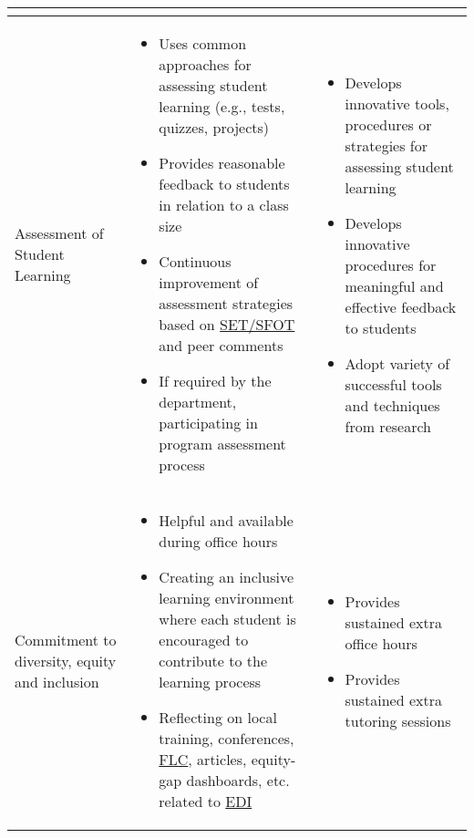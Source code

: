 \documentclass{article}
\begin{document}
\begin{longtable}{p{2cm}p{6cm}P{6cm}}
\begin{itemize}[noitemsep,leftmargin=*,topsep=0pt,partopsep=0pt]
    \end{itemize}\\ 
\hline
Assessment of Student Learning
 & \vspace{-\baselineskip}%
  \begin{itemize}[noitemsep,leftmargin=*,topsep=0pt,partopsep=0pt]
        \item Uses common approaches for assessing student learning (e.g., tests, quizzes, projects)
        \item Provides reasonable feedback to students in relation to a class size     
        \item Continuous improvement of assessment strategies based on \href{https://www.csuchico.edu/ir/sfot/}{SET/SFOT} and peer comments
        \item If required by the department, participating in program assessment process
    \end{itemize}
  & %
    \begin{itemize}[noitemsep,leftmargin=*,topsep=0pt,partopsep=0pt]
        \item Develops innovative tools, procedures or strategies for assessing student learning
        \item Develops innovative procedures for meaningful and effective feedback to students
        \item Adopt variety of successful tools and techniques from research
     \end{itemize}\\ 
\hline
Commitment to diversity, equity and inclusion
 & \vspace{-\baselineskip}%
  \begin{itemize}[noitemsep,leftmargin=*,topsep=0pt,partopsep=0pt]
        \item Helpful and available during office hours
        \item Creating an inclusive learning environment where each student is encouraged to contribute to the learning process
        \item Reflecting on local training, conferences, \href{https://www.csuchico.edu/fdev/homepage/flcs.shtml}{FLC}, articles, equity-gap dashboards, etc. related to \href{https://www.csuchico.edu/diversity/}{EDI}       
    \end{itemize}
  & %
    \begin{itemize}[noitemsep,leftmargin=*,topsep=0pt,partopsep=0pt]
        \item Provides sustained extra office hours
        \item Provides sustained extra tutoring sessions

\end{itemize}
\end{longtable}
\end{document}
